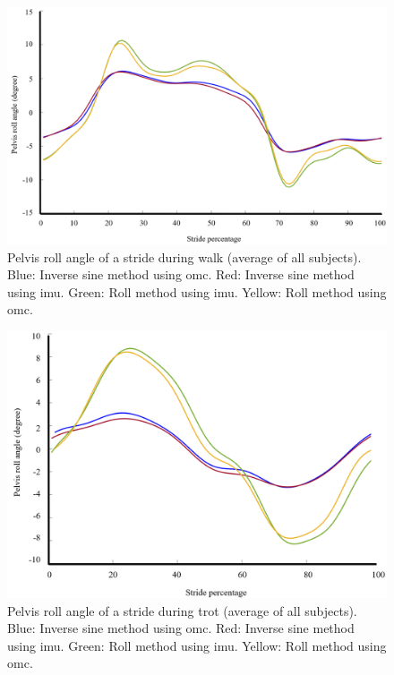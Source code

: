 \begin{figure}[htbp]
\centering
\includegraphics[width=.95\linewidth]{chapters/Pelvis/figures/PR.png}
\caption{Pelvis roll angle of a stride during walk (average of all subjects). Blue: Inverse sine method using \gls{omc}. Red: Inverse sine method using \gls{imu}. Green: Roll method using \gls{imu}. Yellow: Roll method using \gls{omc}.}
\label{fig:walk}
\end{figure}

\begin{figure}[htbp]
\centering
\includegraphics[width=.95\linewidth]{chapters/Pelvis/figures/PRtrot.png}
\caption{Pelvis roll angle of a stride during trot (average of all subjects). Blue: Inverse sine method using \gls{omc}. Red: Inverse sine method using \gls{imu}. Green: Roll method using \gls{imu}. Yellow: Roll method using \gls{omc}.}
\label{fig:trot}
\end{figure}